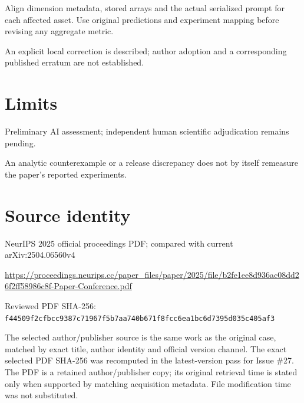 \documentclass[11pt]{article}
\begin{document}
Align dimension metadata, stored arrays and the actual serialized prompt for each affected asset. Use original predictions and experiment mapping before revising any aggregate metric.

An explicit local correction is described; author adoption and a corresponding published erratum are not established.

\section*{Limits}

Preliminary AI assessment; independent human scientific adjudication remains pending.\par

An analytic counterexample or a release discrepancy does not by itself remeasure the paper’s reported experiments.\par

\section*{Source identity}

NeurIPS 2025 official proceedings PDF; compared with current arXiv:2504.06560v4

\url{https://proceedings.neurips.cc/paper_files/paper/2025/file/b2fe1ee8d936ac08dd26f2ff58986c8f-Paper-Conference.pdf}

Reviewed PDF SHA-256: \nolinkurl{f44509f2cfbcc9387c71967f5b7aa740b671f8fcc6ea1bc6d7395d035c405af3}

The selected author/publisher source is the same work as the original case, matched by exact title, author identity and official version channel. The exact selected PDF SHA-256 was recomputed in the latest-version pass for Issue \#27. The PDF is a retained author/publisher copy; its original retrieval time is stated only when supported by matching acquisition metadata. File modification time was not substituted.
\end{document}
